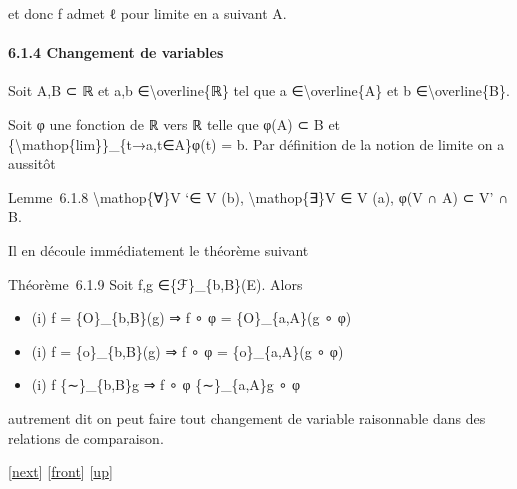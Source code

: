\documentclass[]{article}
\begin{document}
et donc f admet ℓ pour limite en a suivant A.

\paragraph{6.1.4 Changement de variables}

Soit A,B ⊂ ℝ et a,b ∈\textbackslash{}overline\{ℝ\} tel que a
∈\textbackslash{}overline\{A\} et b ∈\textbackslash{}overline\{B\}.

Soit φ une fonction de ℝ vers ℝ telle que φ(A) ⊂ B et
\{\textbackslash{}mathop\{lim\}\}\_\{t→a,t∈A\}φ(t) = b. Par définition
de la notion de limite on a aussitôt

Lemme~6.1.8 \textbackslash{}mathop\{∀\}V `∈ V (b),
\textbackslash{}mathop\{∃\}V ∈ V (a), φ(V ∩ A) ⊂ V' ∩ B.

Il en découle immédiatement le théorème suivant

Théorème~6.1.9 Soit f,g ∈\{ℱ\}\_\{b,B\}(E). Alors

\begin{itemize}
\itemsep1pt\parskip0pt
\item
  (i) f = \{O\}\_\{b,B\}(g) ⇒ f ∘ φ = \{O\}\_\{a,A\}(g ∘ φ)
\item
  (i) f = \{o\}\_\{b,B\}(g) ⇒ f ∘ φ = \{o\}\_\{a,A\}(g ∘ φ)
\item
  (i) f \{∼\}\_\{b,B\}g ⇒ f ∘ φ \{∼\}\_\{a,A\}g ∘ φ
\end{itemize}

autrement dit on peut faire tout changement de variable raisonnable dans
des relations de comparaison.

{[}\href{coursse33.html}{next}{]} {[}\href{coursse32.html}{front}{]}
{[}\href{coursch7.html\#coursse32.html}{up}{]}
\end{document}
